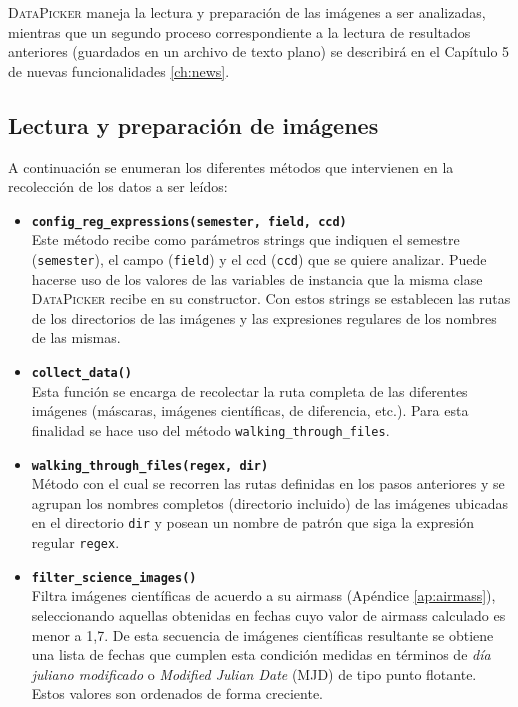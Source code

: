 \textsc{DataPicker} maneja  la lectura y preparaci\'on de las im\'agenes a ser analizadas, mientras que un segundo proceso correspondiente a la lectura de resultados anteriores (guardados en un archivo de texto plano) se describir\'a en el Cap\'itulo 5 de nuevas funcionalidades \ref{ch:news}. 
\bigskip
  
\subsection{Lectura y preparaci\'on de im\'agenes}
A continuaci\'on se enumeran los diferentes m\'etodos que intervienen en la recolecci\'on de los datos a ser le\'idos:

\begin{itemize}
\item \textbf{\texttt{config\_reg\_expressions(semester, field, ccd)}}\\
Este m\'etodo recibe como par\'ametros strings que indiquen el semestre (\texttt{semester}), el campo (\texttt{field}) y el ccd (\texttt{ccd}) que se quiere analizar. Puede hacerse uso de los valores de las variables de instancia que la misma clase \textsc{DataPicker} recibe en su constructor. Con estos strings se establecen las rutas de los directorios de las im\'agenes y las expresiones regulares de los nombres de las mismas.
\bigskip

\item \textbf{\texttt{collect\_data()}}\\
Esta funci\'on se encarga de recolectar la ruta completa de las diferentes im\'agenes (m\'ascaras, im\'agenes cient\'ificas, de diferencia, etc.). Para esta finalidad se hace uso del m\'etodo \texttt{walking\_through\_files}. 
\bigskip

\item \textbf{\texttt{walking\_through\_files(regex, dir)}}\\
M\'etodo con el cual se recorren las rutas definidas en los pasos anteriores y se agrupan los nombres completos (directorio incluido) de las im\'agenes ubicadas en el directorio \texttt{dir} y posean un nombre de patr\'on que siga la expresi\'on regular \texttt{regex}.
\bigskip

\item \textbf{\texttt{filter\_science\_images()}}\\
Filtra im\'agenes cient\'ificas de acuerdo a su airmass (Ap\'endice  \ref{ap:airmass}), seleccionando aquellas obtenidas en fechas cuyo valor de airmass calculado es menor a 1,7. De esta secuencia de im\'agenes cient\'ificas resultante se obtiene una lista de fechas que cumplen esta condici\'on medidas en t\'erminos de \textit{d\'ia juliano modificado} o \textit{Modified Julian Date} (MJD) de tipo punto flotante. Estos valores son ordenados de forma creciente.%
\bigskip


\end{itemize}
